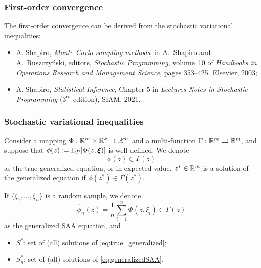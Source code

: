 \documentclass{beamer}
\def\bxi{\boldsymbol\xi}
\begin{document}
\begin{frame}
\frametitle{First-order convergence}

The {\blue first-order convergence} can be derived from the stochastic variational inequalities:
\begin{itemize}
	\item 
A. Shapiro, {\sl Monte Carlo sampling methods},
in A.~Shapiro and A.~Ruszczy\'nski, editors, {\sl Stochastic Programming}, volume~10 of {\sl Handbooks in Operations Research and Management Science}, pages 353--425. Elsevier, 2003;
\item
A. Shapiro, {\sl Statistical Inference}, Chapter 5 in {\sl Lectures Notes in Stochastic Programming} ($3^{\text{rd}}$ edition), SIAM, 2021.
\end{itemize}

\end{frame}

\begin{frame}
\frametitle{Stochastic variational inequalities}

Consider a mapping $\Phi: \mathbb{R}^m \times \mathbb{R}^k \rightarrow \mathbb{R}^m$ and a multi-function $\Gamma: \mathbb{R}^m \rightrightarrows  \mathbb{R}^m$, and suppose that $\phi(z) := \EE_{P}[\Phi(z, \bxi)]$ is well defined.
We denote
\begin{equation}
\phi(z) \in \Gamma(z)
\label{eq:true_generalized}
\end{equation}
as the true {\blue generalized equation}, or in expected value.
$z^* \in \mathbb{R}^m$ is a solution of the generalized equation if $\phi(z^*) \in \Gamma(z^*)$.

\mbox{}

If $\lbrace \xi_1,\ldots,\xi_n \rbrace$ is a random sample, we denote
\begin{equation}
\hat{\phi}_n(z) = \frac{1}{n} \sum_{i=1}^n \Phi(z,\xi_i) \in \Gamma(z)
\label{eq:generalizedSAA}
\end{equation}
as the generalized SAA equation, and
\begin{itemize}
	\item $S^*$: set of (all) solutions of \eqref{eq:true_generalized};
	\item $S^*_n$: set of (all) solutions of \eqref{eq:generalizedSAA}.
\end{itemize}

\end{frame}
\end{document}
